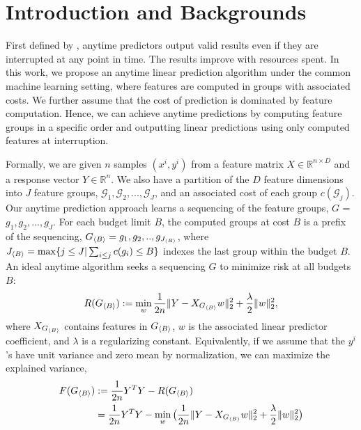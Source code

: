 \section{Introduction and Backgrounds}

First defined by \cite{anytime}, anytime predictors output 
valid results even if they are interrupted at any point in time. The results improve with resources spent. In this work, we propose an anytime linear prediction algorithm under the common 
machine learning setting, where features are computed in groups with associated costs. We further assume that the cost of 
prediction is dominated by feature computation. Hence, 
we can achieve anytime predictions by computing feature groups
in a specific order and outputting linear predictions 
using only computed features at interruption.

Formally, we are given $n$ samples $(x^i, y^i)$ from 
a feature matrix $X \in \mathbb{R}^{n \times D}$ and a response vector $Y \in \mathbb{R}^n$. We also have a partition of the
$D$ feature dimensions into $J$ feature groups, 
$\mathcal{G}_1, \mathcal{G}_2, ..., \mathcal{G}_J$, and 
an associated cost of each group $c(\mathcal{G}_j)$. Our anytime prediction approach learns a sequencing of the
feature groups, $G$ = $g_1, g_2,..., g_J$. 
For each budget limit $B$, the computed
groups at cost $B$ is a prefix of the sequencing, $G_{\langle B \rangle} = g_1, g_2,.., g_{J_{\langle B \rangle}}$, 
where 
$J_{\langle B \rangle} = \max \{ j\leq J | \sum _{i\leq j} c(g_i) \leq B \}$ indexes the last group within the budget $B$. 
An ideal anytime algorithm seeks a sequencing $G$ to minimize risk at all budgets $B$:
\begin{align}
\label{eq:risk}
R(G_{\langle B \rangle}) :=   \min _{w}
    \frac{1}{2n} \Vert Y - X_{{G_{\langle B \rangle}}} {w} \Vert_2^2 + \frac{\lambda}{2} \Vert w\Vert_2^2,
\end{align}
where $X_{G_{\langle B \rangle}}$ contains features in $G_{\langle B \rangle}$, $w$ is the associated linear predictor coefficient, and $\lambda$ is a regularizing constant.
Equivalently, if we assume that the $y^i$'s have unit variance and zero mean by normalization, we can maximize the explained variance, 
\begin{align}    
\label{eq:exp-var}
    F(G_{\langle B \rangle}) &:= \frac{1}{2n} Y^TY - R(G_{\langle B \rangle}) \\
     &=  \frac{1}{2n} Y^TY - 
     \min _{w} \big(
    \frac{1}{2n} \Vert Y - X_{{G_{\langle B \rangle}}} {w} \Vert_2^2 + \frac{\lambda}{2} \Vert w\Vert_2^2 \big)
\end{align}


